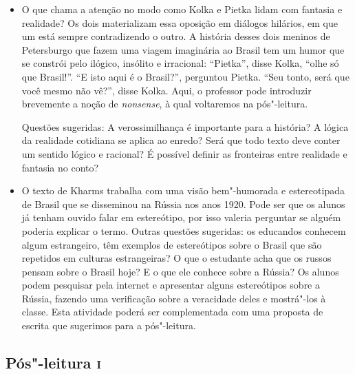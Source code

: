 \documentclass[11pt]{extarticle}
\begin{document}
\begin {itemize}
\item O que chama a atenção no modo como Kolka e Pietka lidam com fantasia e
realidade? Os dois materializam essa oposição em diálogos hilários, em
que um está sempre contradizendo o outro. A história desses dois meninos
de Petersburgo que fazem uma viagem imaginária ao Brasil tem um humor
que se constrói pelo ilógico, insólito e irracional: ``Pietka'', disse
Kolka, ``olhe só que Brasil!''. ``E isto aqui é o Brasil?'', perguntou
Pietka. ``Seu tonto, será que você mesmo não vê?'', disse Kolka. Aqui, o
professor pode introduzir brevemente a noção de \emph{nonsense}, à qual
voltaremos na pós"-leitura.

Questões sugeridas: A verossimilhança é importante para a história? A
lógica da realidade cotidiana se aplica ao enredo? Será que todo texto
deve conter um sentido lógico e racional? É possível definir as
fronteiras entre realidade e fantasia no conto?


\item O texto de Kharms trabalha com uma visão bem"-humorada e estereotipada
de Brasil que se disseminou na Rússia nos anos 1920. Pode ser que os
alunos já tenham ouvido falar em estereótipo, por isso valeria perguntar
se alguém poderia explicar o termo. Outras questões sugeridas: os
educandos conhecem algum estrangeiro, têm exemplos de estereótipos sobre
o Brasil que são repetidos em culturas estrangeiras? O que o estudante
acha que os russos pensam sobre o Brasil hoje? E o que ele conhece sobre
a Rússia? Os alunos podem pesquisar pela internet e apresentar alguns
estereótipos sobre a Rússia, fazendo uma verificação sobre a veracidade
deles e mostrá"-los à classe. Esta atividade poderá ser complementada com
uma proposta de escrita que sugerimos para a pós"-leitura.
\end{itemize}

\subsection{Pós"-leitura \textsc{i}}
\end{document}
